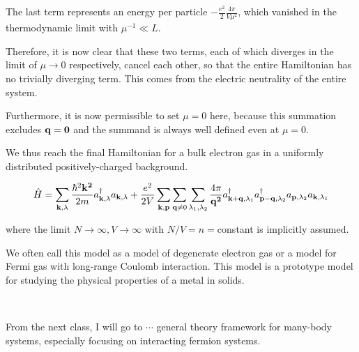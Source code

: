 The last term represents an energy per particle $-\displaystyle\frac{e^2}{2}\frac{4\pi}{V\mu^2}$, which vanished in the thermodynamic limit with $\mu^{-1}\ll L$. 

Therefore, it is now clear that these two terms, each of which diverges in the limit of $\mu\to0$ respectively, cancel each other, so that the entire Hamiltonian has no trivially diverging term. This comes from the electric neutrality of the entire system. 

Furthermore, it is now permissible to set $\mu=0$ here, because this summation excludes $\bf q=0$ and the summand is always well defined even at $\mu =0$. 

We thus reach the final Hamiltonian for a bulk electron gas in a uniformly distributed positively-charged background. 

\begin{align}\label{eq1.8.14}
\hat{H}=\sum_{{\bf k},\lambda}\frac{\hbar^2\bf k^2}{2m}a^\dagger_{{\bf k},\lambda}a_{{\bf k},\lambda} + \frac{e^2}{2V}\sum_{\bf k,p} \sum_{{\bf q}\neq0}\sum_{\lambda_1,\lambda_2}\frac{4\pi}{{\bf q^2}}a^\dagger_{{\bf k+q},\lambda_1}a^\dagger_{{\bf p-q},\lambda_2}a_{{\bf p},\lambda_2}a_{{\bf k},\lambda_1}
\end{align}

where the limit $N\to\infty, V\to\infty$ with $N/V=n=$constant is implicitly assumed. 

We often call this model as a model of degenerate electron gas or a model for Fermi gas with long-range Coulomb interaction. This model is a prototype model for studying the physical properties of a metal in solids. 

\dotfill

\ 

From the next class, I will go to $\cdots$ general theory framework for many-body systems, especially focusing on interacting fermion systems. 
